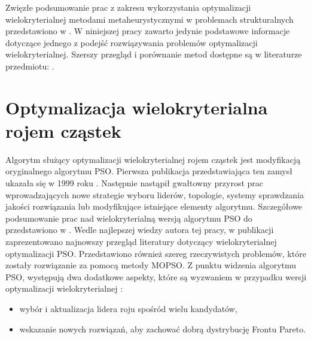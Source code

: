 Zwięzłe podsumowanie prac z zakresu wykorzystania optymalizacji wielokryterialnej metodami metaheurystycznymi w problemach strukturalnych przedstawiono w \parencite{Zavala2014}. W niniejszej pracy zawarto jedynie podstawowe informacje dotyczące jednego z podejść rozwiązywania problemów optymalizacji wielokryterialnej. Szerszy przegląd i porównanie metod dostępne są w literaturze przedmiotu: \parencite{Miettinen1999,Zitzler2000,Elbeltagi2005,Abido2006,Coello2007,Lalwani2013,Zaman2019}. 

\section{Optymalizacja wielokryterialna rojem cząstek}
Algorytm służący optymalizacji wielokryterialnej rojem cząstek  jest modyfikacją oryginalnego algorytmu PSO. Pierwsza publikacja przedstawiająca ten zamysł ukazała się w 1999 roku \parencite{Moore1999}. Następnie nastąpił gwałtowny przyrost prac wprowadzających nowe strategie wyboru liderów, topologie, systemy sprawdzania jakości rozwiązania lub modyfikujące istniejące elementy algorytmu. Szczegółowe podsumowanie prac nad wielokryterialną wersją algorytmu PSO do  przedstawiono w \parencite{CoelloCoello2006}. Wedle najlepszej wiedzy autora tej pracy, w publikacji \cite{Lalwani2013} zaprezentowano najnowszy przegląd literatury dotyczący wielokryterialnej optymalizacji PSO. Przedstawiono również szereg rzeczywistych problemów, które zostały rozwiązanie za pomocą metody MOPSO.
Z punktu widzenia algorytmu PSO, występują dwa dodatkowe aspekty, które są wyzwaniem w przypadku wersji optymalizacji wielokryterialnej \parencite{Pulido2005OnTU}:
\begin{itemize}
	\item wybór i aktualizacja lidera roju spośród wielu kandydatów,
	\item wskazanie nowych rozwiązań, aby zachować dobrą dystrybucję Frontu Pareto.
\end{itemize}
